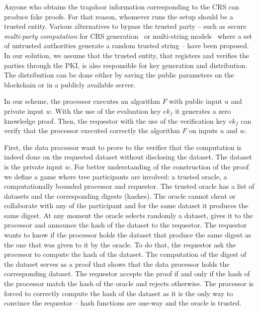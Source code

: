 Anyone who obtains the trapdoor information corresponding to the CRS can produce fake proofs. For that reason, whomever runs the setup should be a trusted entity. Various alternatives to bypass the trusted party -- such as secure \textit{multi-party computation} for CRS generation~\cite{zcash_mpc} or multi-string models~\cite{groth2014cryptography} where a set of untrusted authorities generate a random trusted string -- have been proposed. In our solution, we assume that the trusted entity, that registers and verifies the parties through the PKI, is also responsible for key generation and distribution. The distribution can be done either by saving the public parameters on the blockchain or in a publicly available server.

In our scheme, the processor executes an algorithm $F$ with public input $u$ and private input $w$. With the use of the evaluation key $ek_f$ it generates a zero knowledge proof. Then, the requestor with the use of the verification key $vk_f$ can verify that the processor executed correctly the algorithm $F$ on inputs $u$ and $w$.

First, the data processor want to prove to the verifier that the computation is indeed done on the requested dataset without disclosing the dataset. The dataset is the private input $w$. For better understanding of the construction of the proof we define a game where tree participants are involved: a trusted oracle, a  computationally bounded processor and requestor. The trusted oracle has a list of datasets and the corresponding digests (hashes). The oracle cannot cheat or collaborate with any of the participant and for the same dataset it produces the same digest. At any moment the oracle selects randomly a dataset, gives it to the processor and announce the hash of the dataset to the requestor. The requestor wants to know if the processor holds the dataset that produce the same digest as the one that was given to it by the oracle. To do that, the requestor ask the processor to compute the hash of the dataset. The computation of the digest of the dataset serves as a proof that shows that the data processor holds the corresponding dataset. The requestor accepts the proof if and only if the hash of the processor match the hash of the oracle and rejects otherwise. The processor is forced to correctly compute the hash of the dataset as it is the only way to convince the requestor -- hash functions are one-way and the oracle is trusted.


